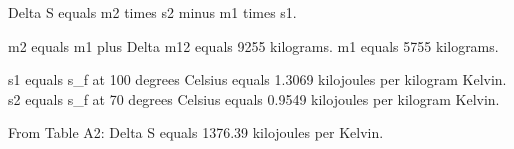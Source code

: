 Delta S equals m2 times s2 minus m1 times s1.  

m2 equals m1 plus Delta m12 equals 9255 kilograms.  
m1 equals 5755 kilograms.  

s1 equals s_f at 100 degrees Celsius equals 1.3069 kilojoules per kilogram Kelvin.  
s2 equals s_f at 70 degrees Celsius equals 0.9549 kilojoules per kilogram Kelvin.  

From Table A2:  
Delta S equals 1376.39 kilojoules per Kelvin.